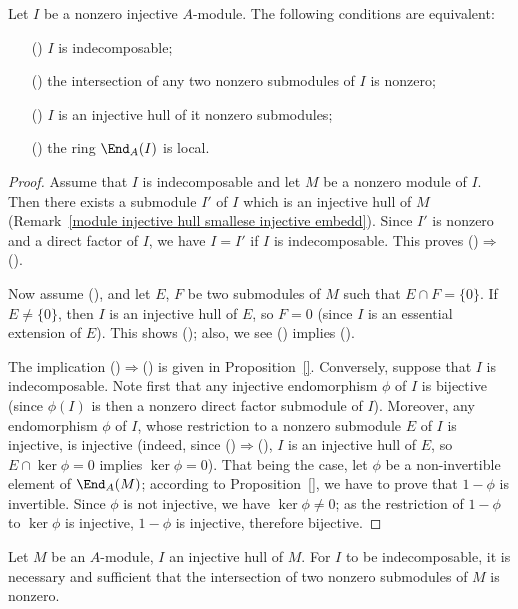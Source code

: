 \begin{proposition}\label{module injective indecomposable iff}
Let $I$ be a nonzero injective $A$-module. The following conditions are equivalent:
\begin{itemize}
\item[(\rmnum{1})] $I$ is indecomposable;
\item[(\rmnum{2})] the intersection of any two nonzero submodules of $I$ is nonzero;
\item[(\rmnum{3})] $I$ is an injective hull of it nonzero submodules;
\item[(\rmnum{4})] the ring $\End_A(I)$ is local.
\end{itemize}
\end{proposition}
\begin{proof}
Assume that $I$ is indecomposable and let $M$ be a nonzero module of $I$. Then there exists a submodule $I'$ of $I$ which is an injective hull of $M$ (Remark~\ref{module injective hull smallese injective embedd}). Since $I'$ is nonzero and a direct factor of $I$, we have $I=I'$ if $I$ is indecomposable. This proves ()$\Rightarrow$().\par
Now assume (), and let $E$, $F$ be two submodules of $M$ such that $E\cap F=\{0\}$. If $E\neq\{0\}$, then $I$ is an injective hull of $E$, so $F=0$ (since $I$ is an essential extension of $E$). This shows (); also, we see () implies ().\par
The implication ()$\Rightarrow$() is given in Proposition~\ref{}. Conversely, suppose that $I$ is indecomposable. Note first that any injective endomorphism $\phi$ of $I$ is bijective (since $\phi(I)$ is then a nonzero direct factor submodule of $I$). Moreover, any endomorphism $\phi$ of $I$, whose restriction to a nonzero submodule $E$ of $I$ is injective, is injective (indeed, since ()$\Rightarrow$(), $I$ is an injective hull of $E$, so $E\cap\ker\phi=0$ implies $\ker\phi=0$). That being the case, let $\phi$ be a non-invertible element of $\End_A(M)$; according to Proposition~\ref{}, we have to prove that $1-\phi$ is invertible. Since $\phi$ is not injective, we have $\ker\phi\neq 0$; as the restriction of $1-\phi$ to $\ker\phi$ is injective, $1-\phi$ is injective, therefore bijective.
\end{proof}
\begin{corollary}\label{module injective hull indecomposable iff}
Let $M$ be an $A$-module, $I$ an injective hull of $M$. For $I$ to be indecomposable, it is necessary and sufficient that the intersection of two nonzero submodules of $M$ is nonzero.
\end{corollary}
